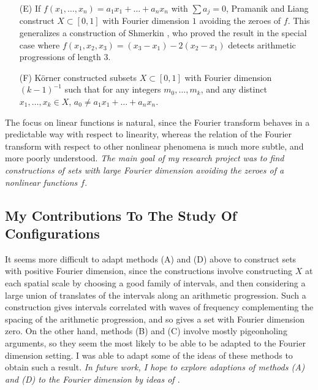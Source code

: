 \documentclass[11pt]{article}
\begin{document}
%
\begin{itemize}
	\item[(E)] If $f(x_1,\dots,x_n) = a_1x_1 + \dots + a_nx_n$ with $\sum a_j = 0$, Pramanik and Liang \cite{PramanikLiang} construct $X \subset [0,1]$ with Fourier dimension $1$ avoiding the zeroes of $f$. This generalizes a construction of Shmerkin \cite{Shmerkin}, who proved the result in the special case where $f(x_1,x_2,x_3) = (x_3 - x_1) - 2 (x_2 - x_1)$ detects arithmetic progressions of length 3.

	\item[(F)] K\"{o}rner constructed subsets $X \subset [0,1]$ with Fourier dimension $(k-1)^{-1}$ such that for any integers $m_0,\dots,m_k$, and any distinct $x_1,\dots,x_k \in X$, $a_0 \neq a_1x_1 + \dots + a_nx_n$.
\end{itemize}
%
The focus on linear functions is natural, since the Fourier transform behaves in a predictable way with respect to linearity, whereas the relation of the Fourier transform with respect to other nonlinear phenomena is much more subtle, and more poorly understood. \emph{The main goal of my research project was to find constructions of sets with large Fourier dimension avoiding the zeroes of a nonlinear functions $f$}.

\subsection{My Contributions To The Study Of Configurations} \label{MyContributionFractals}

It seems more difficult to adapt methods (A) and (D) above to construct sets with positive Fourier dimension, since the constructions involve constructing $X$ at each spatial scale by choosing a good family of intervals, and then considering a large union of translates of the intervals along an arithmetic progression. Such a construction gives intervals correlated with waves of frequency complementing the spacing of the arithmetic progression, and so gives a set with Fourier dimension zero. On the other hand, methods (B) and (C) involve mostly pigeonholing arguments, so they seem the most likely to be able to be adapted to the Fourier dimension setting. I was able to adapt some of the ideas of these methods to obtain such a result. \emph{In future work, I hope to explore adaptions of methods (A) and (D) to the Fourier dimension by ideas of \cite{Shmerkin}}.
\end{document}
